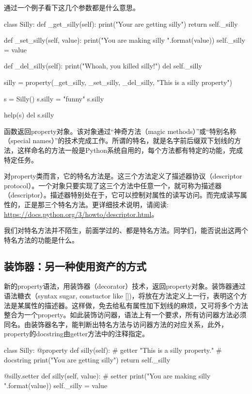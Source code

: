 \begin{python}
通过一个例子看下这几个参数都是什么意思。
\begin{python}
class Silly:
    def _get_silly(self):
        print("Your are getting silly")
        return self._silly

    def _set_silly(self, value):
        print("You are making silly {}".format(value))
        self._silly = value

    def _del_silly(self):
        print("Whoah, you killed silly!")
        del self._silly

    silly = property(_get_silly, _set_silly, _del_silly, "This is a silly property")

s = Silly()
s.silly = "funny"
s.silly

help(s)
del s.silly
\end{python}

函数返回property对象。该对象通过“神奇方法（magic methods）”或“特别名称（special names）”的技术完成工作。所谓的特名，就是名字前后缀双下划线的方法，这样命名的方法一般是Python系统自用的，每个方法都有特定的功能，完成特定任务。

对property类而言，它的特名方法是。这三个方法定义了描述器协议（descriptor protocol）。一个对象只要实现了这三个方法中任意一个，就可称为描述器（descriptor）。描述器特别处在于，它可以控制对属性的读写访问。而完成读写属性的，正是那三个特名方法。更详细技术说明，请阅读: \url{https://docs.python.org/3/howto/descriptor.html}。

我们对特名方法并不陌生，前面学过的、都是特名方法。同学们，能否说出这两个特名方法的功能是什么。

\subsection{装饰器：另一种使用资产的方式}
新的property语法，用装饰器（decorator）技术，返回property对象。装饰器通过语法糖衣（syntax sugar, constuctor like [])，将放在方法定义上一行，表明这个方法是某属性的描述器。这样做，免去给私有属性加下划线的麻烦，又可将多个方法整合为一个property。如此装饰访问器，语法上有一个要求，所有访问器方法必须同名。由装饰器名字，能判断出特名方法与访问器方法的对应关系，此外，property的docstring由getter方法中的注释指定。
\begin{python}
class Silly:
    @property
    def silly(self):  # getter
        "This is a silly property."  # docstring
        print("You are getting silly")
        return self._silly

    @silly.setter
    def silly(self, value): #  setter
        print("You are making silly {}".format(value))
        self._silly = value


\end{python}
\end{python}
